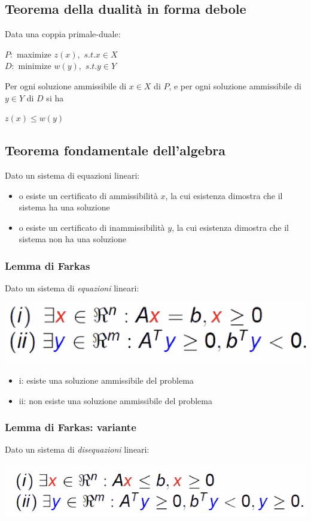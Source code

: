 \documentclass[11pt, oneside]{article}   	%
\begin{document}
\subsection{Teorema della dualità in forma debole}
Data una coppia primale-duale:
\begin{center}
$P:$ maximize $ z(x),$ $s.t. x \in X$ \\
$D:$ minimize $ w(y),$ $s.t. y \in Y$
\end{center}
Per ogni soluzione ammissibile di $x \in X$ di $P$, e per ogni soluzione ammissibile di $y \in Y$ di $D$ si ha
\begin{center}
$z(x) \leq w(y)$
\end{center}
\subsection{Teorema fondamentale dell'algebra}
Dato un sistema di equazioni lineari: \begin{itemize}
\item o esiste un certificato di ammissibilità $x$, la cui esistenza dimostra che il sistema ha una soluzione
\item o esiste un certificato di inammissibilità $y$, la cui esistenza dimostra che il sistema non ha una soluzione
\end{itemize}
\subsubsection{Lemma di Farkas}
Dato un sistema di \emph{equazioni} lineari:
\begin{center}
\includegraphics[scale=1]{farkas}
\end{center}
\begin{itemize}
\item i: esiste una soluzione ammissibile del problema
\item ii: non esiste una soluzione ammissibile del problema 
\end{itemize}
\subsubsection{Lemma di Farkas: variante}
Dato un sistema di \emph{disequazioni} lineari:
\begin{center}
\includegraphics[scale=1]{farkas2}
\end{center}
\end{document}
